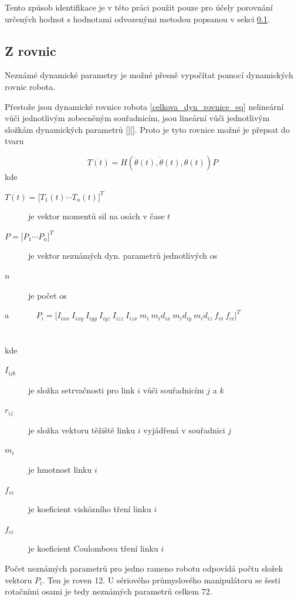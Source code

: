 Tento způsob identifikace je v této práci použit pouze pro účely porovnání určených hodnot s hodnotami odvozenými metodou popsanou v sekci \ref{z_rovnic_sec}.
\label{z_3d_modelu_sec}

\subsection{Z rovnic}
\label{z_rovnic_sec}
Neznámé dynamické parametry je možné přesně vypočítat pomocí dynamických rovnic robota. 

Přestože jsou dynamické rovnice robota \ref{celkova_dyn_rovnice_eq} nelineární vůči jednotlivým zobecněným souřadnicím, jsou lineární vůči jednotlivým složkám dynamických parametrů [\cite{clos_dyn_par}][\cite{dyn_mod_ind}]. Proto je tyto rovnice možné je přepsat do tvaru

\begin{equation}
T(t) = H(\ddot{\theta}(t),\dot{\theta}(t),\theta(t))P
\label{eq_lin_par}
\end{equation}
kde
\begin{description}
\item[$T(t) = {\big[T_1(t)  \dotsm  T_n(t)\big]}^{T}$] je vektor momentů sil na osách v čase $t$ 
\item[$P = {\big[P_1  \dotsm  P_n\big]}^{T}$] je vektor neznámých dyn. parametrů jednotlivých os
\item[$n$] je počet os
\end{description} \noindent
a \ \ \ \ \ \ $P_i = {\big[I_{ixx} \ I_{ixy} \ I_{iyy} \ I_{iyz} \ I_{izz} \ I_{izx} \ m_i \ m_id_{ix} \ m_id_{iy} \ m_id_{iz} \ f_{vi} \ f_{ci}\big]}^{T}$ \\
\\
\\
kde
\noindent
\begin{description}
\item[$I_{ijk}$] je složka setrvačnosti pro link $i$ vůči souřadnicím $j$ a $k$
\item[$r_{ij}$] je složka vektoru těžiště linku $i$ vyjádřená v souřadnici $j$
\item[$m_{i}$] je hmotnost linku $i$
\item[$f_{vi}$] je koeficient viskózního tření linku $i$
\item[$f_{ci}$] je koeficient Coulombova tření linku $i$
\end{description}

Počet neznámých parametrů pro jedno rameno robotu odpovídá počtu složek vektoru $P_i$. Ten je roven 12. U sériového průmyslového manipulátoru se šesti rotačními osami je tedy neznámých parametrů celkem 72. 

